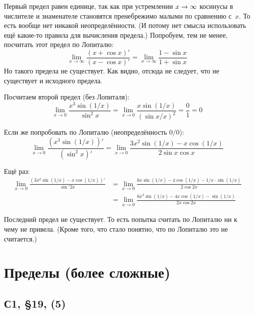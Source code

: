 \documentclass[a4paper,12pt]{article}
\begin{document}
  \begin{solution}
    Первый предел равен единице, так как при устремлении $x \hm\to \infty$ косинусы в числителе и знаменателе становятся пренебрежимо малыми по сравнению с~$x$.
    То есть вообще нет никакой неопределённости.
    (И потому нет смысла использовать ещё какие-то правила для вычисления предела.)
    Попробуем, тем не менее, посчитать этот предел по Лопиталю:
    \[
      \lim_{x \to \infty} \frac{(x + \cos x)'}{(x - \cos x)'} = \lim_{x \to \infty} \frac{1 - \sin x}{1 + \sin x}
    \]
    Но такого предела не существует.
    Как видно, отсюда не следует, что не существует и исходного предела.

    Посчитаем второй предел (без Лопиталя):
    \[
      \lim_{x \to 0} \frac{x^3 \sin{(1/x)}}{\sin^2 x} = \lim_{x \to 0} \frac{x \sin{(1/x)}}{(\sin x / x)^2} = \frac{0}{1} = 0
    \]

    Если же попробовать по Лопиталю (неопределённость $0/0$):
    \[
      \lim_{x \to 0} \frac{\left(x^3 \sin{(1/x)}\right)'}{\left(\sin^2 x\right)'}
        = \lim_{x \to 0} \frac{3x^2 \sin(1/x) - x \cos(1/x)}{2 \sin x \cos x}
    \]

    Ещё раз:
    \begin{equation*}
    \begin{split}
      \lim_{x \to 0} \frac{\left(3x^2 \sin(1/x) - x \cos(1/x)\right)'}{\sin' 2x}
        &= \lim_{x \to 0} \frac{6x \sin(1/x) - 4\cos(1/x) - 1/x \cdot \sin(1/x)}{2 \cos 2x}\\
        &= \lim_{x \to 0} \frac{6x^2 \sin(1/x) - 4x \cos(1/x) - \sin(1/x)}{2x \cos 2x}
    \end{split}
    \end{equation*}

    Последний предел не существует.
    То есть попытка считать по Лопиталю ни к чему не привела.
    (Кроме того, что стало понятно, что по Лопиталю это не считается.)
  \end{solution}
  

  
  \section{Пределы (более сложные)}
  
  
  \subsection{С1, \S 19, (5)}
  \label{n:1-19-14(5)}
  
\end{document}
